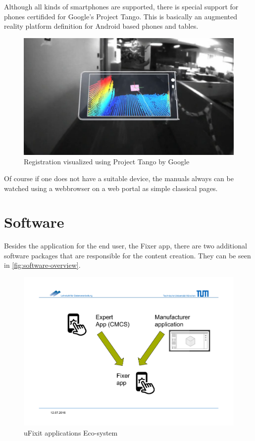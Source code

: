 		Although all kinds of smartphones are supported, there is special support for phones certifided for Google's Project Tango. This is basically an augmented reality platform definition for Android based phones and tables.
		
		\begin{figure}[H]
			\centering
			\includegraphics[width=0.7\linewidth]{../images/project-tango}
			\caption{Registration visualized using Project Tango by Google}
			\label{fig:project-tango}
		\end{figure}
		
		Of course if one does not have a suitable device, the manuals always can be watched using a webbrowser on a web portal as simple classical pages.
		
	
	\section{Software}
		
		Besides the application for the end user, the Fixer app, there are two additional software packages that are responsible for the content creation. They can be seen in \autoref{fig:software-overview}.
		
		\begin{figure}[H]
			\includegraphics[width=\textwidth, trim=4cm 3cm 3cm 4cm, clip]{../images/software-overview.pdf}
			\centering
			\caption{uFixit applications Eco-system}
			\label{fig:software-overview}
		\end{figure}
		
